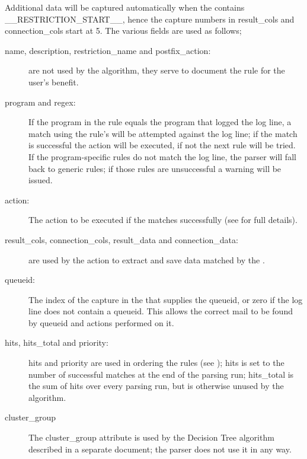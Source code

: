 Additional data will be captured automatically when the \regex{} contains 
\_\_RESTRICTION\_START\_\_, hence the capture numbers in result\_cols and
connection\_cols start at 5.  The various fields are used as follows;

\begin{description}

    \item [name, description, restriction\_name and postfix\_action:] are
        not \newline used by the algorithm, they serve to document the rule
        for the user's benefit.

    \item [program and regex:] If the program in the rule equals the
        program that logged the log line, a match using the rule's
        \regex{} will be attempted against the log line; if the match is
        successful the action will be executed, if not the next rule will
        be tried.  If the program-specific rules do not match the log line,
        the parser will fall back to generic rules; if those rules are
        unsuccessful a warning will be issued.

    \item [action:] The action to be executed if the \regex{} matches
        successfully (see  for full details).

    \item [result\_cols, connection\_cols, result\_data and
        connection\_data:] are \newline used by the action to extract and
        save data matched by the \regex{}.

    \item [queueid:] The index of the capture in the \regex{} that
        supplies the queueid, or zero if the log line does not contain a
        queueid.  This allows the correct mail to be found by queueid and
        actions performed on it.

    \item [hits, hits\_total and priority:] hits and priority are used in
        ordering the rules (see );
        hits is set to the number of successful matches at the end of the
        parsing run; hits\_total is the sum of hits over every parsing run,
        but is otherwise unused by the algorithm.

    \item [cluster\_group] The cluster\_group attribute is used by the
        Decision Tree algorithm described in a separate document; the
        parser does not use it in any way.

\end{description}



